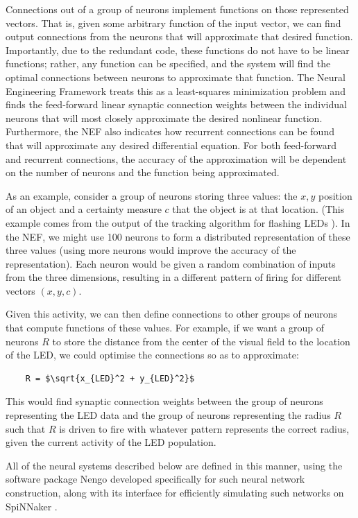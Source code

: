 \documentclass[conference]{IEEEtran}
\begin{document}
Connections out of a group of neurons implement functions on those represented 
vectors. That is, given some arbitrary function of the input vector, we can
find output connections from the neurons that will approximate that desired
function.  Importantly, due to 
the redundant code, these functions do not have to be linear functions; 
rather, any function can be specified, and the system will find the optimal
connections between neurons to approximate that function. The Neural Engineering 
Framework treats this as a least-squares minimization problem and finds the 
feed-forward linear synaptic connection weights between the individual neurons that will 
most closely approximate the desired nonlinear function. Furthermore, the NEF 
also indicates how recurrent connections can be found that will approximate 
any desired differential equation.  For both feed-forward and recurrent 
connections, the accuracy of the approximation will be dependent on the 
number of neurons and the function being approximated. 

As an example, consider a group of neurons storing three values: the $x,y$ 
position of an object and a certainty measure $c$ that the object is at that
location.  (This example comes from the output of the tracking algorithm 
for flashing LEDs \cite{muller2011miniature}).  In the NEF, we might use 100 
neurons to form a distributed representation of these three values 
(using more neurons would improve the accuracy of the representation).  Each
neuron would be given a random combination of inputs from the three dimensions,
resulting in a different pattern of firing for different vectors $(x,y,c)$.

Given this activity, we can then define connections to other groups of neurons
that compute functions of these values. For example, if we want a group of 
neurons $R$ to store the distance from the center of the visual field to the 
location of the LED, we could optimise the connections so
as to approximate: 
 
\begin{lstlisting}
    R = $\sqrt{x_{LED}^2 + y_{LED}^2}$
\end{lstlisting}

This would find synaptic connection weights between the group of neurons 
representing the LED data and the group of neurons representing the 
radius $R$ such that $R$ is driven to fire with whatever pattern represents 
the correct radius, given the current activity of the LED population. 

All of the neural systems described below are defined in this manner, using
the software package Nengo \cite{bekolay_nengo2014} developed specifically
for such neural network construction, along with its interface
for efficiently simulating such networks on SpiNNaker \cite{mundy2015}.
\end{document}

